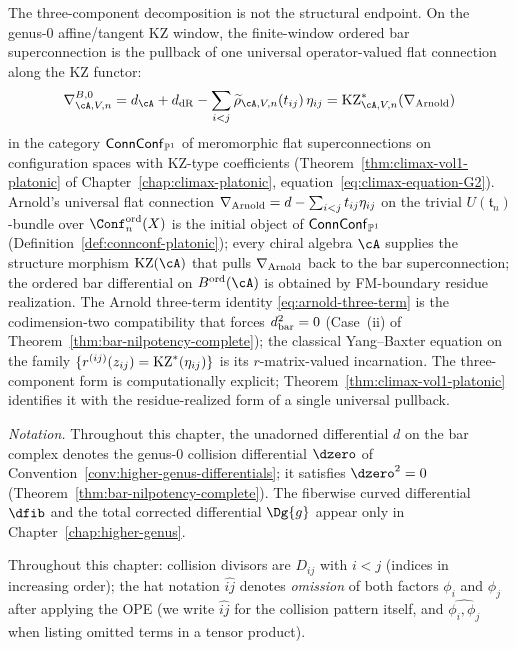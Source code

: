 The three-component decomposition is not the structural endpoint.
On the genus-$0$ affine/tangent KZ window, the finite-window ordered
bar superconnection is the pullback of one universal operator-valued
flat connection along the KZ functor:
\[
\nabla^{B,0}_{\cA,V,n}
=d_\cA+d_{\mathrm{dR}}
-\sum_{i<j}\widetilde\rho_{\cA,V,n}(t_{ij})\,\eta_{ij}
=\KZ_{\cA,V,n}^{*}(\nabla_{\Arn})
\]
in the category $\mathsf{ConnConf}_{\mathbb{P}^1}$ of meromorphic flat
superconnections on configuration spaces with KZ-type coefficients
\textup{(}Theorem~\ref{thm:climax-vol1-platonic} of
Chapter~\ref{chap:climax-platonic}, equation~\eqref{eq:climax-equation-G2}\textup{)}.
Arnold's universal flat connection
$\nabla_{\mathrm{Arnold}} = d - \sum_{i<j} t_{ij}\eta_{ij}$ on the trivial
$U(\mathfrak{t}_n)$-bundle over $\Conf_n^{\mathrm{ord}}(X)$ is the
initial object of $\mathsf{ConnConf}_{\mathbb{P}^1}$
\textup{(}Definition~\ref{def:connconf-platonic}\textup{)};
every chiral algebra $\cA$ supplies the structure morphism
\(\KZ(\cA)\) that pulls \(\nabla_{\mathrm{Arnold}}\) back to the bar
superconnection; the ordered bar differential on
\(B^{\mathrm{ord}}(\cA)\) is obtained by FM-boundary residue
realization. The Arnold three-term identity
\eqref{eq:arnold-three-term} is the codimension-two compatibility that
forces $d_{\mathrm{bar}}^2 = 0$ \textup{(}Case~(ii) of
Theorem~\ref{thm:bar-nilpotency-complete}\textup{)}; the classical
Yang--Baxter equation on the family
$\{r^{(ij)}(z_{ij}) = \mathrm{KZ}^{*}(\eta_{ij})\}$ is its $r$-matrix-valued
incarnation. The three-component form is computationally explicit;
Theorem~\ref{thm:climax-vol1-platonic} identifies it with the
residue-realized form of a single universal pullback.

\smallskip
\noindent\textit{Notation.}
Throughout this chapter, the unadorned differential $d$ on the bar complex denotes the genus-$0$ collision differential $\dzero$ of Convention~\ref{conv:higher-genus-differentials}; it satisfies $\dzero^2 = 0$ (Theorem~\ref{thm:bar-nilpotency-complete}). The fiberwise curved differential $\dfib$ and the total corrected differential $\Dg{g}$ appear only in Chapter~\ref{chap:higher-genus}.

\medskip

\begin{convention}\label{conv:set-notation}
Throughout this chapter: collision divisors are $D_{ij}$ with $i < j$ (indices in increasing order); the hat notation $\widehat{ij}$ denotes \emph{omission} of both factors $\phi_i$ and $\phi_j$ after applying the OPE (we write $\widehat{ij}$ for the collision pattern itself, and $\widehat{\phi_i, \phi_j}$ when listing omitted terms in a tensor product).
\end{convention}

